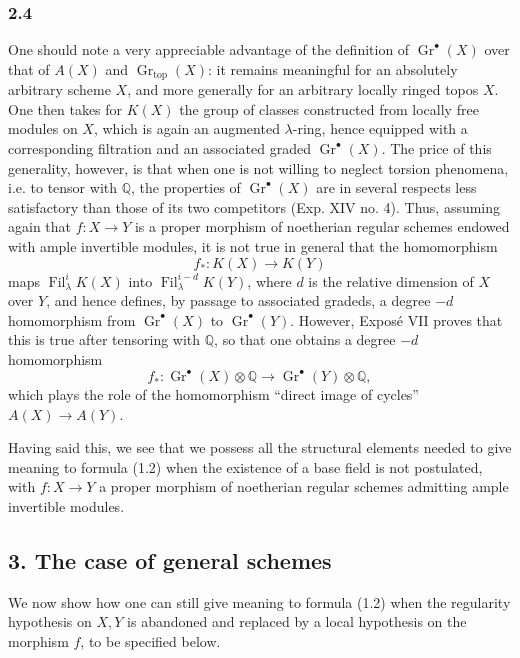 \documentclass[11pt]{article}
\newcommand{\Gr}{\operatorname{Gr}}
\newcommand{\Fil}{\operatorname{Fil}}
\providecommand{\Gr}{\operatorname{Gr}}
\providecommand{\Gr}{\operatorname{G}}
\begin{document}
\subsubsection*{2.4}
One should note a very appreciable advantage of the definition of $\Gr^\bullet(X)$ over that of $A(X)$ and $\Gr_{\mathrm{top}}(X)$: it remains meaningful for an absolutely arbitrary scheme $X$, and more generally for an arbitrary locally ringed topos $X$. One then takes for $K(X)$ the group of classes constructed from locally free modules on $X$, which is again an augmented $\lambda$-ring, hence equipped with a corresponding filtration and an associated graded $\Gr^\bullet(X)$. The price of this generality, however, is that when one is not willing to neglect torsion phenomena, i.e. to tensor with $\mathbb Q$, the properties of $\Gr^\bullet(X)$ are in several respects less satisfactory than those of its two competitors (Exp. XIV no. 4). Thus, assuming again that $f:X\to Y$ is a proper morphism of noetherian regular schemes endowed with ample invertible modules, it is not true in general that the homomorphism
\[
f_*:K(X)\longrightarrow K(Y)
\]
maps $\Fil^i_\lambda K(X)$ into $\Fil^{i-d}_\lambda K(Y)$, where $d$ is the relative dimension of $X$ over $Y$, and hence defines, by passage to associated gradeds, a degree $-d$ homomorphism from $\Gr^\bullet(X)$ to $\Gr^\bullet(Y)$. However, Exposé VII proves that this is true after tensoring with $\mathbb Q$, so that one obtains a degree $-d$ homomorphism
\begin{equation}\tag{2.5}
f_*:\Gr^\bullet(X)\otimes\mathbb Q\longrightarrow \Gr^\bullet(Y)\otimes\mathbb Q,
\end{equation}
which plays the role of the homomorphism ``direct image of cycles'' $A(X)\to A(Y)$.

Having said this, we see that we possess all the structural elements needed to give meaning to formula (1.2) when the existence of a base field is not postulated, with $f:X\to Y$ a proper morphism of noetherian regular schemes admitting ample invertible modules.

\subsection*{3. The case of general schemes}
We now show how one can still give meaning to formula (1.2) when the regularity hypothesis on $X,Y$ is abandoned and replaced by a local hypothesis on the morphism $f$, to be specified below.
\end{document}

